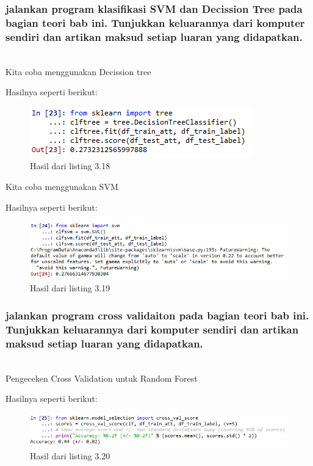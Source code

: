 \subsubsection{jalankan program klasiﬁkasi SVM dan Decission Tree pada bagian teori bab ini. Tunjukkan keluarannya dari komputer sendiri dan artikan maksud setiap luaran yang didapatkan.}
\hfill\\
Kita coba menggunakan Decission tree

Hasilnya seperti berikut:
\begin{figure}[H]
	\centering
	\includegraphics{figures/1174075/3/27.png}
	\caption{Hasil dari listing 3.18}
\end{figure}

Kita coba menggunakan SVM

Hasilnya seperti berikut:
\begin{figure}[H]
	\centering
	\includegraphics[width=12cm]{figures/1174075/3/28.png}
	\caption{Hasil dari listing 3.19}
\end{figure}

\subsubsection{jalankan program cross validaiton pada bagian teori bab ini. Tunjukkan keluarannya dari komputer sendiri dan artikan maksud setiap luaran yang didapatkan.}
\hfill\\
Pengeceken Cross Validation untuk Random Forest

Hasilnya seperti berikut:
\begin{figure}[H]
	\centering
	\includegraphics[width=12cm]{figures/1174075/3/29.png}
	\caption{Hasil dari listing 3.20}
\end{figure}

